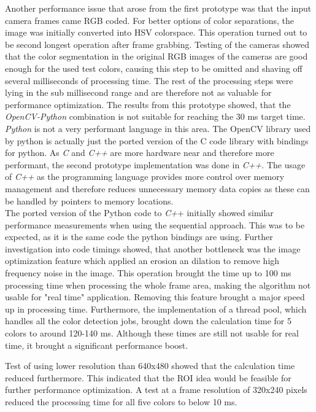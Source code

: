Another performance issue that arose from the first prototype was that the input camera frames came RGB coded. For better options of color separations, the image was  initially converted into HSV colorspace. This operation turned out to be second longest operation after frame grabbing. Testing of the cameras showed that the color segmentation in the original RGB images of the cameras are good enough for the used test colors, causing this step to be omitted and shaving off several milliseconds of processing time.
The rest of the processing steps were lying in the sub millisecond range and are therefore not as valuable for performance optimization.
The results from this prototype showed, that the \textit{OpenCV-Python} combination is not suitable for reaching the 30 ms target time. \textit{Python} is not a very performant language in this area. The OpenCV library used by python is actually just the ported version of the C code library with bindings for python. As \textit{C} and \textit{C++} are more hardware near and therefore more performant, the second prototype implementation was done in \textit{C++}. The usage of \textit{C++} as the programming language provides more control over memory management and therefore reduces unnecessary memory data copies as these can be handled by pointers to memory locations.\\
The ported version of the Python code to\textit{ C+}+ initially showed similar performance measurements when using the sequential approach. This was to be expected, as it is the same code the python bindings are using. Further investigation into code timings showed, that another bottleneck was the image optimization feature which applied an erosion an dilation to remove high frequency noise in the image. This operation brought the time up to 100 ms processing time when processing the whole frame area, making the algorithm  not usable for "real time" application. Removing this feature brought a major speed up in processing time. 
Furthermore, the implementation of a thread pool, which handles all the color detection jobs, brought down the calculation time for 5 colors to around 120-140 ms. Although these times are still not usable for real time, it brought a significant performance boost.

Test of using lower resolution than 640x480 showed that the calculation time reduced furthermore. This indicated that the ROI idea would be feasible for  further performance optimization. A test at a frame resolution of 320x240 pixels reduced the processing time for all five colors to below 10 ms.\\

